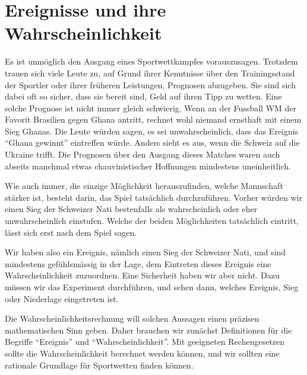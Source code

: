 %
%
%
\chapter{Ereignisse und ihre Wahrscheinlichkeit} \label{chapter:ereignisse-und-wahrscheinlichkeit}

Es ist unmöglich den Ausgang eines Sportwettkampfes vorauszusagen.
Trotzdem trauen sich viele Leute zu, auf Grund ihrer Kenntnisse über den
Trainingsstand der Sportler oder ihrer früheren Leistungen,
Prognosen abzugeben.
Sie sind sich dabei oft so sicher, dass sie bereit sind, Geld auf ihren Tipp
zu wetten.
Eine solche Prognose ist nicht immer gleich schwierig.
Wenn an der
Fussball WM der Favorit Brasilien gegen Ghana antritt,
rechnet wohl niemand ernsthaft mit einem Sieg Ghanas.
Die Leute würden
sagen, es sei unwahrscheinlich, dass das Ereignis ``Ghana gewinnt'' eintreffen
würde.
Anders sieht es aus, wenn die Schweiz auf die Ukraine trifft.
Die Prognosen über den Ausgang dieses Matches waren auch abseits
manchmal etwas chauvinistischer Hoffnungen mindestens uneinheitlich.

Wie auch immer, die einzige Möglichkeit herauszufinden, welche Mannschaft
stärker ist, besteht darin, das Spiel tatsächlich durchzuführen.
Vorher würden wir einen Sieg der Schweizer Nati bestenfalls als
wahrscheinlich oder eher unwahrscheinlich einstufen.
Welche der beiden Möglichkeiten tatsächlich eintritt, lässt sich
erst nach dem Spiel sagen.

Wir haben also ein Ereignis, nämlich einen Sieg der Schweizer Nati,
und sind mindestens gefühlsmässig in der Lage, dem Eintreten dieses
Ereignis eine Wahrscheinlichkeit zuzuordnen.
Eine Sicherheit haben wir aber nicht.
Dazu müssen wir das Experiment durchführen, und sehen dann,
welches Ereignis, Sieg oder Niederlage eingetreten ist.

Die Wahrscheinlichkeitsrechnung will solchen Aussagen einen präzisen
mathematischen Sinn geben.
Daher brauchen wir zunächst Definitionen
für die Begriffe ``Ereignis'' und ``Wahrscheinlichkeit''.
Mit geeigneten
Rechengesetzen sollte die Wahrscheinlichkeit berechnet werden können,
und wir sollten eine rationale Grundlage für Sportwetten finden können.











